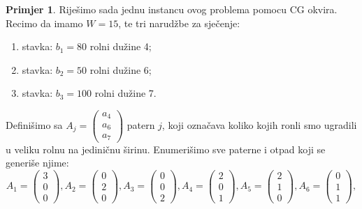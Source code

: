 \documentclass[b5paper, utf8, 11pt, colorlinks]{book}
\theoremstyle{definition}
\newtheorem{primjer}{Primjer}[chapter]
\begin{document}
\begin{primjer} Riješimo sada jednu instancu ovog problema pomocu CG okvira. Recimo da imamo $W = 15$, te tri narudžbe za sječenje:
	\end{primjer}
 \begin{enumerate}
 	\item stavka: $b_1=80$ rolni dužine 4;
 	\item stavka: $b_2=50$ rolni dužine 6;
 	\item stavka: $b_3=100$ rolni dužine 7. 
 \end{enumerate}
 Definišimo sa $A_j = \begin{pmatrix}
                          a_4 \\
                          a_6 \\
                          a_7
                   \end{pmatrix}$
                 patern $j$, koji označava koliko   kojih ronli smo ugradili u veliku rolnu na jediničnu širinu. Enumerišimo sve paterne i otpad koji se generiše njime: 
               $$A_1 = 
               \begin{pmatrix}
               	     3 \\
               	     0 \\
               	     0  
               \end{pmatrix},
               A_2=\begin{pmatrix}
                 	0 \\
                	2 \\
                	0  
               \end{pmatrix}, 
           A_3=\begin{pmatrix}
           	0 \\
           	0 \\
           	2  
         \end{pmatrix},
           A_4=  \begin{pmatrix}
           	2 \\
           	0 \\
           	1  
           \end{pmatrix},
       A_5 = \begin{pmatrix}
       	2 \\
       	1 \\
       	0  
       \end{pmatrix},
   A_6 =\begin{pmatrix}
      	0 \\
        1 \\
      	1  
   \end{pmatrix},$$
\end{document}
